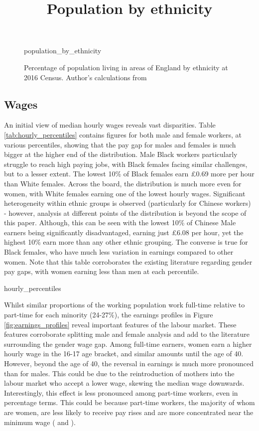\documentclass[class=article, crop=false]{standalone}
\begin{document}
\begin{figure}[]
\centering
    \title{Population by ethnicity}
    {population_by_ethnicity}
    \caption{Percentage of population living in areas of England by ethnicity at 2016 Census. Author's calculations from \citep{ONSd}}
    \label{fig:population_by_ethnicity}
\end{figure}

\subsection{Wages}
\label{sec:Wages}
An initial view of median hourly wages reveals vast disparities. Table \ref{tab:hourly_percentiles} contains figures for both male and female workers, at various percentiles, showing that the pay gap for males and females is much bigger at the higher end of the distribution. Male Black workers particularly struggle to reach high paying jobs, with Black females facing similar challenges, but to a lesser extent. The lowest 10\% of Black females earn £0.69 more per hour than White females. Across the board, the distribution is much more even for women, with White females earning one of the lowest hourly wages. Significant heterogeneity within ethnic groups is observed (particularly for Chinese workers) - however, analysis at different points of the distribution is beyond the scope of this paper. Although, this can be seen with the lowest 10\% of Chinese Male earners being significantly disadvantaged, earning just £6.08 per hour, yet the highest 10\% earn more than any other ethnic grouping. The converse is true for Black females, who have much less variation in earnings compared to other women. Note that this table corroborates the existing literature regarding gender pay gaps, with women earning less than men at each percentile.

{hourly_percentiles}

Whilst similar proportions of the working population work full-time relative to part-time for each minority (24-27\%), the earnings profiles in Figure \ref{fig:earnings_profiles} reveal important features of the labour market. These features corroborate splitting male and female analysis and add to the literature surrounding the gender wage gap. Among full-time earners, women earn a higher hourly wage in the 16-17 age bracket, and similar amounts until the age of 40. However, beyond the age of 40, the reversal in earnings is much more pronounced than for males. This could be due to the reintroduction of mothers into the labour market who accept a lower wage, skewing the median wage downwards. Interestingly, this effect is less pronounced among part-time workers, even in percentage terms. This could be because part-time workers, the majority of whom are women, are less likely to receive pay rises and are more concentrated near the minimum wage (\citet{IFS} and \citet{ONSi}).
\end{document}
